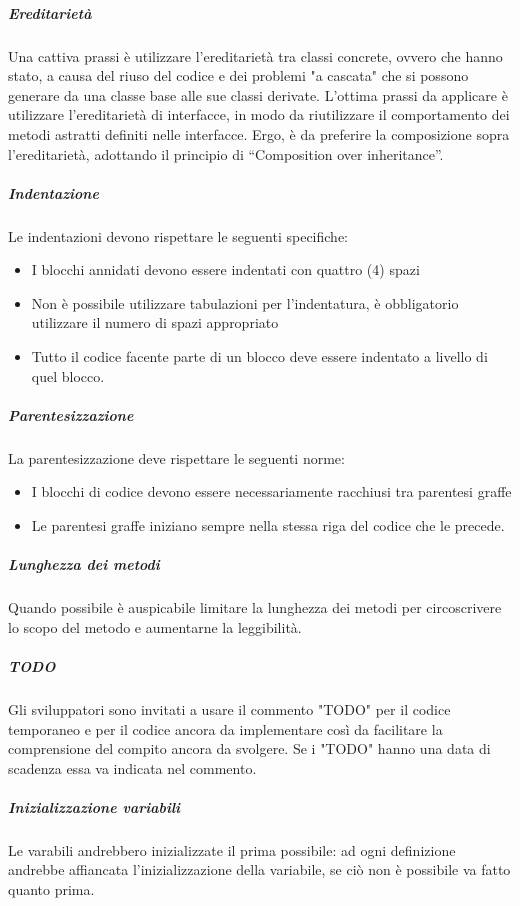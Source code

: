 \documentclass[../../norme-di-progetto.tex]{subfiles}
\begin{document}
\subparagraph{Ereditarietà}%
\label{subp:ereditarieta}
Una cattiva prassi è utilizzare l’ereditarietà tra classi concrete, ovvero che hanno stato, a causa del riuso del codice e dei problemi "a cascata" che si possono generare da una classe base alle sue classi derivate.
L'ottima prassi da applicare è utilizzare l'ereditarietà di interfacce, in modo da riutilizzare il comportamento dei metodi astratti definiti nelle interfacce.
Ergo, è da preferire la composizione sopra l'ereditarietà, adottando il principio di “Composition over inheritance”.

\subparagraph{Indentazione}%
\label{subp:indentazione}
Le indentazioni devono rispettare le seguenti specifiche:
\begin{itemize}
  \item I blocchi annidati devono essere indentati con quattro (4) spazi
  \item Non è possibile utilizzare tabulazioni per l'indentatura, è obbligatorio utilizzare il numero di spazi appropriato
  \item Tutto il codice facente parte di un blocco deve essere indentato a livello di quel blocco.
\end{itemize}

\subparagraph{Parentesizzazione}%
\label{subp:parentesizzazione}
La parentesizzazione deve rispettare le seguenti norme:
\begin{itemize}
  \item I blocchi di codice devono essere necessariamente racchiusi tra parentesi graffe
  \item Le parentesi graffe iniziano sempre nella stessa riga del codice che le precede.
\end{itemize}

\subparagraph{Lunghezza dei metodi}%
\label{subp:lunghezza_metodi}
Quando possibile è auspicabile limitare la lunghezza dei metodi per circoscrivere lo scopo del metodo e aumentarne la leggibilità.

\subparagraph{TODO}%
\label{subp:TODO}
Gli sviluppatori sono invitati a usare il commento "TODO" per il codice temporaneo e per il codice ancora da implementare così da facilitare la comprensione del compito ancora da svolgere.
Se i "TODO" hanno una data di scadenza essa va indicata nel commento.

\subparagraph{Inizializzazione variabili}%
\label{subp:inizializzazione_variabili}
Le varabili andrebbero inizializzate il prima possibile: ad ogni definizione andrebbe affiancata l'inizializzazione della variabile, se ciò non è possibile va fatto quanto prima.
\end{document}
